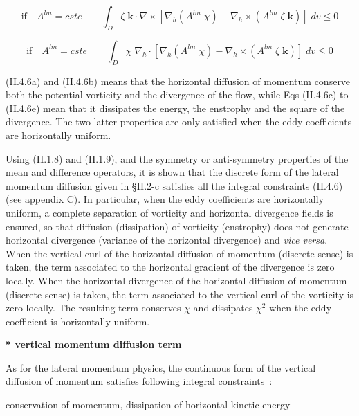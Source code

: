 \documentclass[../main/NEMO_manual]{subfiles}
\begin{document}
\[
  \mbox{if}\quad A^{lm}=cste\quad \quad \int_D {\zeta \;{\mathrm {\mathbf k}}\cdot
    \nabla \times \left[ {\nabla _h \left( {A^{lm}\;\chi } \right)-\nabla _h
        \times \left( {A^{lm}\;\zeta \;{\mathrm {\mathbf k}}} \right)} \right]\;dv}
  \leqslant 0
\]

\[
  \mbox{if}\quad A^{lm}=cste\quad \quad \int_D {\chi \;\nabla _h \cdot \left[
      {\nabla _h \left( {A^{lm}\;\chi } \right)-\nabla _h \times \left(
          {A^{lm}\;\zeta \;{\mathrm {\mathbf k}}} \right)} \right]\;dv} \leqslant 0
\]

(II.4.6a) and (II.4.6b) means that the horizontal diffusion of momentum conserve both the potential vorticity and
the divergence of the flow, while Eqs (II.4.6c) to (II.4.6e) mean that it dissipates the energy, the enstrophy and
the square of the divergence.
The two latter properties are only satisfied when the eddy coefficients are horizontally uniform.

Using (II.1.8) and (II.1.9), and the symmetry or anti-symmetry properties of the mean and difference operators,
it is shown that the discrete form of the lateral momentum diffusion given in
{\S}II.2-c satisfies all the integral constraints (II.4.6) (see appendix C).
In particular, when the eddy coefficients are horizontally uniform,
a complete separation of vorticity and horizontal divergence fields is ensured,
so that diffusion (dissipation) of vorticity (enstrophy) does not generate horizontal divergence
(variance of the horizontal divergence) and \textit{vice versa}.
When the vertical curl of the horizontal diffusion of momentum (discrete sense) is taken,
the term associated to the horizontal gradient of the divergence is zero locally.
When the horizontal divergence of the horizontal diffusion of momentum (discrete sense) is taken,
the term associated to the vertical curl of the vorticity is zero locally.
The resulting term conserves $\chi$ and dissipates $\chi^2$ when the eddy coefficient is horizontally uniform.

\textbf{* vertical momentum diffusion term}

As for the lateral momentum physics, the continuous form of the vertical diffusion of
momentum satisfies following integral constraints~:

conservation of momentum, dissipation of horizontal kinetic energy
\end{document}
